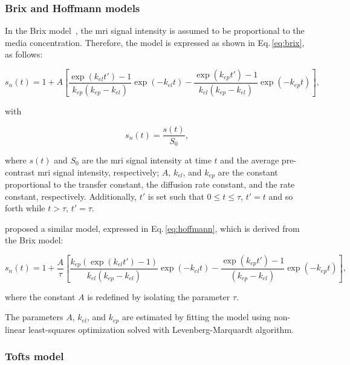 \subsubsection{Brix and Hoffmann models}\label{sec:brixhoffmann}

In the Brix model~\cite{brix1991pharmacokinetic}, the \ac{mri} signal intensity is assumed to be proportional to the media concentration.
Therefore, the model is expressed as shown in Eq.\,\eqref{eq:brix}, as
follows:

\begin{dmath}
  s_n(t) = 1 + A \left[ \frac{\exp(k_{el} t') - 1}{k_{ep}(k_{ep} - k_{el})} \exp(- k_{el} t) - \frac{\exp(k_{ep} t') - 1}{k_{el}(k_{ep} - k_{el})} \exp(- k_{ep} t) \right],
  \label{eq:brix}
\end{dmath}

\noindent with

\begin{equation}
  s_n(t) = \frac{s(t)}{S_0},
  \label{eq:enh}
\end{equation}

\noindent where $s(t)$ and $S_0$ are the \ac{mri} signal intensity at time $t$ and the average pre-contrast \ac{mri} signal intensity, respectively; $A$, $k_{el}$, and $k_{ep}$ are the constant proportional to the transfer constant, the diffusion rate constant, and the rate constant, respectively.
Additionally, $t'$ is set such that $0 \leq t \leq \tau$, $t' = t$ and
so forth while $t > \tau$, $t' = \tau$.

\citeauthor{hoffmann1995pharmacokinetic} proposed a similar model,
expressed in Eq.\,\eqref{eq:hoffmann}, which is derived from the Brix model:

\begin{dmath}
  s_n(t) = 1 + \frac{A}{\tau} \left[ \frac{k_{ep} \left( \exp(k_{el} t') - 1 \right)}{k_{el}(k_{ep} - k_{el})} \exp(- k_{el} t) - \frac{\exp(k_{ep} t') - 1}{(k_{ep} - k_{el})} \exp(- k_{ep} t) \right] ,
  \label{eq:hoffmann}
\end{dmath}

\noindent where the constant $A$ is redefined by isolating the parameter $\tau$.

The parameters $A$, $k_{el}$, and $k_{ep}$ are estimated by fitting
the model using non-linear least-squares optimization solved with
Levenberg-Marquardt algorithm.

\subsubsection{Tofts model}\label{sec:tofts}

